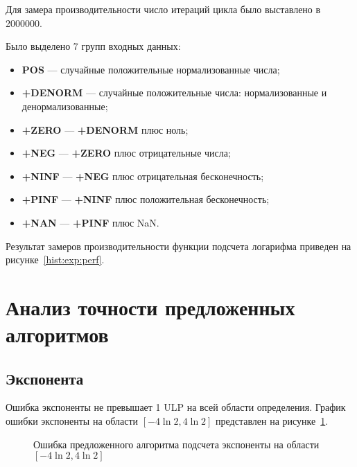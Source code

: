 Для замера производительности число итераций цикла было выставлено в 2000000.

Было выделено 7 групп входных данных:

\begin{itemize}
    \item \textbf{POS} --- случайные положительные нормализованные числа;
    \item \textbf{+DENORM} --- случайные положительные числа: нормализованные и денормализованные;
    \item \textbf{+ZERO} --- \textbf{+DENORM} плюс ноль;
    \item \textbf{+NEG} --- \textbf{+ZERO} плюс отрицательные числа;
    \item \textbf{+NINF} --- \textbf{+NEG} плюс отрицательная бесконечность;
    \item \textbf{+PINF} --- \textbf{+NINF} плюс положительная бесконечность;
    \item \textbf{+NAN} --- \textbf{+PINF} плюс NaN.
\end{itemize}

Результат замеров производительности функции подсчета логарифма приведен на рисунке~\ref{hist:exp:perf}.

\section{Анализ точности предложенных алгоритмов}

\subsection{Экспонента}

Ошибка экспоненты не превышает 1 ULP на всей области определения.
График ошибки экспоненты на области $[-4\ln{2}, 4\ln{2}]$ представлен на рисунке~\ref{plot:exp:small}.

\begin{figure}[hbt]
  \centering
  \caption{Ошибка предложенного алгоритма подсчета экспоненты на области $[-4\ln{2}, 4\ln{2}]$}
  \label{plot:exp:small}
\end{figure}

